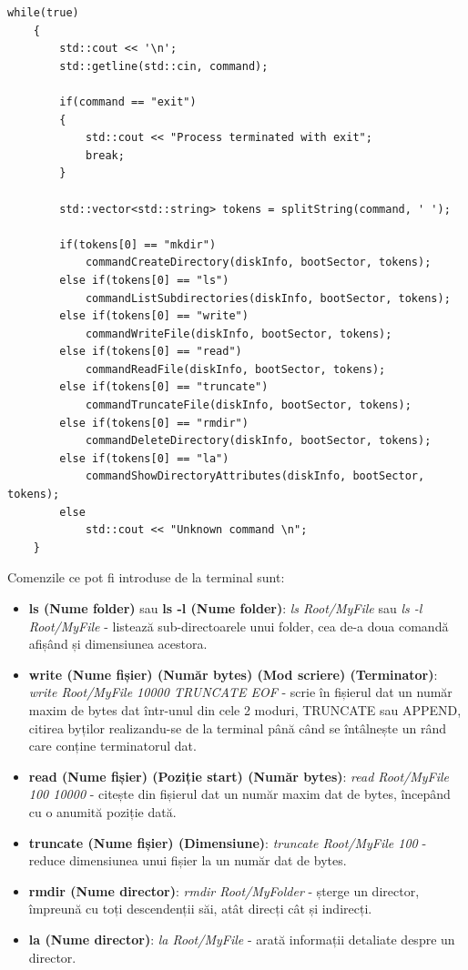 \bigskip

\lstset{style=code-snyppet-style}
\begin{lstlisting}
while(true)
    {
        std::cout << '\n';
        std::getline(std::cin, command);

        if(command == "exit")
        {
            std::cout << "Process terminated with exit";
            break;
        }

        std::vector<std::string> tokens = splitString(command, ' ');

        if(tokens[0] == "mkdir")
            commandCreateDirectory(diskInfo, bootSector, tokens);
        else if(tokens[0] == "ls")
            commandListSubdirectories(diskInfo, bootSector, tokens);
        else if(tokens[0] == "write")
            commandWriteFile(diskInfo, bootSector, tokens);
        else if(tokens[0] == "read")
            commandReadFile(diskInfo, bootSector, tokens);
        else if(tokens[0] == "truncate")
            commandTruncateFile(diskInfo, bootSector, tokens);
        else if(tokens[0] == "rmdir")
            commandDeleteDirectory(diskInfo, bootSector, tokens);
        else if(tokens[0] == "la")
            commandShowDirectoryAttributes(diskInfo, bootSector, tokens);
        else
            std::cout << "Unknown command \n";
    }
\end{lstlisting}

\bigskip

Comenzile ce pot fi introduse de la terminal sunt:

\begin{itemize}
  \item \textbf{ls (Nume folder)} sau \textbf{ls -l (Nume folder)}: \textit{ls Root/MyFile} sau \textit{ls -l Root/MyFile} - listează sub-directoarele unui folder, cea de-a doua comandă afișând și dimensiunea acestora.

  \item \textbf{write (Nume fișier) (Număr bytes) (Mod scriere) (Terminator)}: \textit{write Root/MyFile 10000 TRUNCATE EOF} - scrie în fișierul dat un număr maxim de bytes dat într-unul din cele 2 moduri, TRUNCATE sau APPEND, citirea byților realizandu-se de la terminal până când se întâlnește un rând care conține terminatorul dat.

  \item \textbf{read (Nume fișier) (Poziție start) (Număr bytes)}: \textit{read Root/MyFile 100 10000} - citește din fișierul dat un număr maxim dat de bytes, începând cu o anumită poziție dată.

  \item \textbf{truncate (Nume fișier) (Dimensiune)}: \textit{truncate Root/MyFile 100} - reduce dimensiunea unui fișier la un număr dat de bytes.

  \item \textbf{rmdir (Nume director)}: \textit{rmdir Root/MyFolder} - șterge un director, împreună cu toți descendenții săi, atât direcți cât și indirecți.

  \item \textbf{la (Nume director)}: \textit{la Root/MyFile} - arată informații detaliate despre un director.
\end{itemize}


